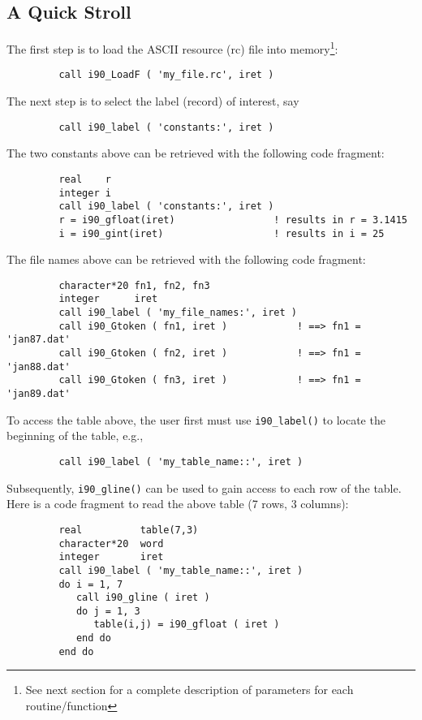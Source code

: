 \subsection{A Quick Stroll}
%
The first step is to load the ASCII resource (rc) file into
memory\footnote{See next section for a complete description
of parameters for each routine/function}:
% 
\begin{verbatim}
         call i90_LoadF ( 'my_file.rc', iret )
\end{verbatim}
% 
The next step is to select the label (record) of interest, say
%  
   \begin{verbatim}
         call i90_label ( 'constants:', iret )
   \end{verbatim}
% 
    The two constants above can be retrieved with the following code
    fragment:
%
   \begin{verbatim}
         real    r
         integer i
         call i90_label ( 'constants:', iret )
         r = i90_gfloat(iret)                 ! results in r = 3.1415
         i = i90_gint(iret)                   ! results in i = 25
   \end{verbatim}
%  
    The file names above can be retrieved with the following
    code fragment:
%
   \begin{verbatim}
         character*20 fn1, fn2, fn3
         integer      iret
         call i90_label ( 'my_file_names:', iret )
         call i90_Gtoken ( fn1, iret )            ! ==> fn1 = 'jan87.dat'
         call i90_Gtoken ( fn2, iret )            ! ==> fn1 = 'jan88.dat'
         call i90_Gtoken ( fn3, iret )            ! ==> fn1 = 'jan89.dat'
   \end{verbatim}
%  
   To access the table above, the user first must use {\tt i90\_label()} to 
   locate the beginning of the table, e.g.,
   \begin{verbatim}
         call i90_label ( 'my_table_name::', iret )
   \end{verbatim}
%  
   Subsequently, {\tt i90\_gline()} can be used to gain access to each
   row of the table. Here is a code fragment to read the above
   table (7 rows, 3 columns):
%  
\begin{verbatim}
         real          table(7,3)
         character*20  word
         integer       iret
         call i90_label ( 'my_table_name::', iret )
         do i = 1, 7
            call i90_gline ( iret )
            do j = 1, 3
               table(i,j) = i90_gfloat ( iret )
            end do                   
         end do
 \end{verbatim}
%
